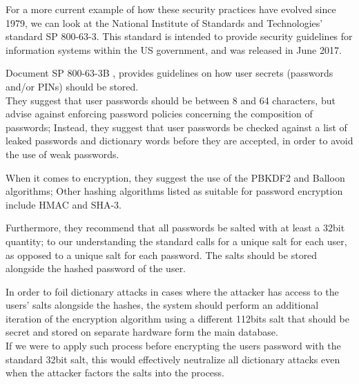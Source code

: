 
For a more current example of how these security practices have evolved since 1979, we can look at the National Institute of Standards and Technologies' standard SP 800-63-3.
This standard is intended to provide security guidelines for information systems within the US government, and was released in June 2017.

Document SP 800-63-3B \cite{NIST_2017}, provides guidelines on how user secrets (passwords and/or PINs) should be stored.\\
They suggest that user passwords should be between 8 and 64 characters, but advise against enforcing password policies concerning the composition of passwords; Instead, they suggest that user passwords be checked against a list of leaked passwords and dictionary words before they are accepted, in order to avoid the use of weak passwords.

When it comes to encryption, they suggest the use of the PBKDF2 and Balloon algorithms; Other hashing algorithms listed as suitable for password encryption include HMAC and SHA-3.

Furthermore, they recommend that all passwords be salted with at least a 32bit quantity; to our understanding the standard calls for a unique salt for each user, as opposed to a unique salt for each password. The salts should be stored alongside the hashed password of the user.

In order to foil dictionary attacks in cases where the attacker has access to the users' salts alongside the hashes, the system should perform an additional iteration of the encryption algorithm using a different 112bits salt that should be secret and stored on separate hardware form the main database.\\
If we were to apply such process before encrypting the users password with the standard 32bit salt, this would effectively neutralize all dictionary attacks even when the attacker factors the salts into the process.

